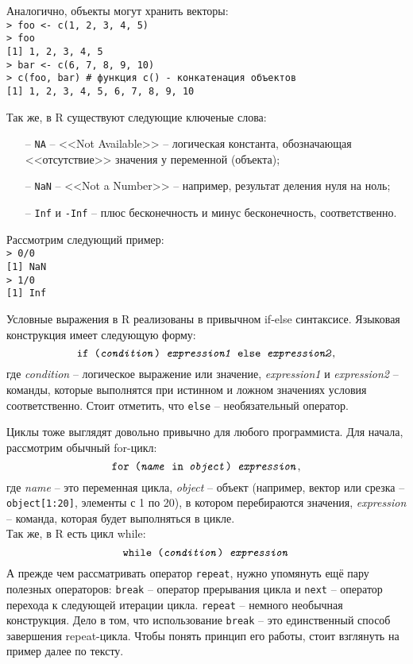     Аналогично, объекты могут хранить векторы: \\
    \indent \texttt{> foo <- c(1, 2, 3, 4, 5)} \\
    \indent \texttt{> foo} \\
    \indent \texttt{[1] 1, 2, 3, 4, 5} \\
    \indent \texttt{> bar <- c(6, 7, 8, 9, 10)} \\
    \indent \texttt{> c(foo, bar) \# функция c() - конкатенация объектов} \\
    \indent \texttt{[1] 1, 2, 3, 4, 5, 6, 7, 8, 9, 10} 

    Так же, в R существуют следующие ключеные слова:
    \begin{itemize}
        \item[--] \texttt{NA} -- <<Not Available>> -- логическая константа, обозначающая
            <<отсутствие>> значения у переменной (объекта);
        \item[--] \texttt{NaN} -- <<Not a Number>> -- например, результат деления нуля на 
            ноль;
        \item[--] \texttt{Inf} и \texttt{-Inf} -- плюс бесконечность и минус бесконечность,
            соответственно.
    \end{itemize}

    Рассмотрим следующий пример:\\
    \indent\texttt{> 0/0} \\
    \indent\texttt{[1] NaN} \\
    \indent\texttt{> 1/0} \\
    \indent\texttt{[1] Inf}

    Условные выражения в R реализованы в привычном if-else синтаксисе. Языковая конструкция
    имеет следующую форму:  
    $$ \texttt{if (\textit{condition}) \textit{expression1} else \textit{expression2}}, $$
    где \textit{condition} -- логическое выражение или значение, \textit{expression1} и 
    \textit{expression2} -- команды, которые выполнятся при истинном и ложном значениях 
    условия соответственно. Стоит отметить, что \texttt{else} -- необязательный оператор.

    Циклы тоже выглядят довольно привычно для любого программиста. Для начала, рассмотрим
    обычный for-цикл: 
    $$ \texttt{for (\textit{name} in \textit{object}) \textit{expression}}, $$
    где \textit{name} -- это переменная цикла, \textit{object} -- объект (например, вектор
    или срезка -- \texttt{object[1:20]}, элементы с 1 по 20), в котором перебираются 
    значения, \textit{expression} -- команда, которая будет выполняться в цикле. \\
    Так же, в R есть цикл while:
    $$ \texttt{while (\textit{condition}) \textit{expression}} $$
    \indent А прежде чем рассматривать оператор \texttt{repeat}, нужно упомянуть ещё пару 
    полезных операторов: \texttt{break} -- оператор прерывания цикла и \texttt{next} -- 
    оператор перехода к следующей итерации цикла. \texttt{repeat} -- немного необычная 
    конструкция. Дело в том, что использование \texttt{break} -- это единственный способ
    завершения repeat-цикла. Чтобы понять принцип его работы, стоит взглянуть на пример
    далее по тексту.

